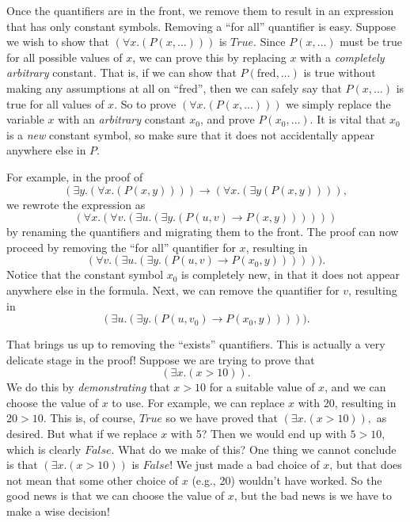 Once the quantifiers are in the front, we remove them to result in an expression that has
only constant symbols. Removing a ``for all'' quantifier is easy. Suppose we wish to show
that $(\forall x.(P(x, \dots)))$ is $True$. Since $P(x, \dots)$ must be true for all possible
values of $x$, we can prove this by replacing $x$ with a \emph{completely arbitrary} constant.
That is, if we can show that $P(\text{fred}, \dots)$ is true without making any assumptions
at all on ``fred'', then we can safely say that $P(x, \dots)$ is true for all values of $x$.
So to prove $(\forall x.(P(x, \dots)))$ we simply replace the variable $x$ with an
\emph{arbitrary} constant $x_0$, and prove $P(x_0, \dots)$. It is vital that $x_0$ is a \emph{new}
constant symbol, so make sure that it does not accidentally appear anywhere else in $P$.

For example, in the proof of 
$$(\exists y.(\forall x.(P(x, y)))) \rightarrow (\forall x.(\exists y (P(x, y)))),$$
we rewrote the expression as
$$(\forall x.(\forall v.(\exists u.(\exists y.(P(u, v) \rightarrow P(x, y))))))$$
by renaming the quantifiers and migrating them to the front. The proof can now proceed
by removing the ``for all'' quantifier for $x$, resulting in
$$(\forall v.(\exists u.(\exists y.(P(u, v) \rightarrow P(x_0, y)))))).$$
Notice that the constant symbol $x_0$ is completely new, in that it does not appear anywhere
else in the formula. Next, we can remove the quantifier for $v$, resulting in
$$(\exists u.(\exists y.(P(u, v_0) \rightarrow P(x_0, y))))).$$

That brings us up to removing the ``exists'' quantifiers. This is actually a very delicate
stage in the proof! Suppose we are trying to prove that
$$(\exists x.(x > 10)).$$
We do this by \emph{demonstrating} that $x>10$ for a suitable value of $x$, and we can choose
the value of $x$ to use. For example, we
can replace $x$ with 20, resulting in $20 > 10.$ This is, of course, $True$ so we have
proved that $(\exists x.(x > 10)),$ as desired. But what if we replace $x$ with 5? Then we
would end up with $5 > 10,$ which is clearly $False$. What do we make of this? One thing
we cannot conclude is that $(\exists x.(x > 10))$ is $False$! We just made a bad choice of $x$,
but that does not mean that some other choice of $x$ (e.g., 20) wouldn't have worked. So
the good news is that we can choose the value of $x$, but the bad news is we have to make
a wise decision!

